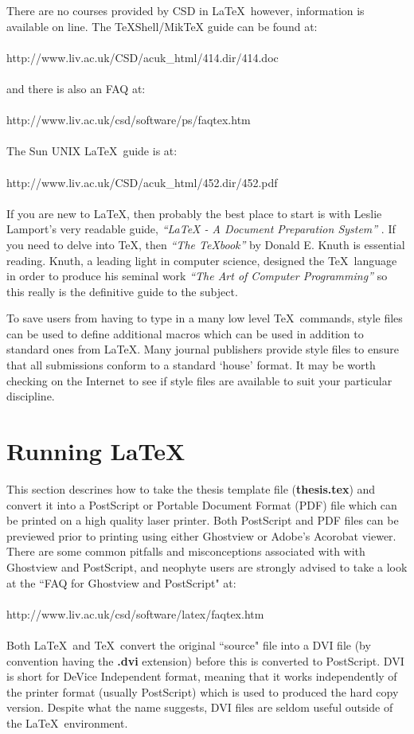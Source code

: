 \documentclass[11pt,oneside]{book}
\begin{document}
There are no courses provided by CSD in \LaTeX \ however, information is available
on line. The TeXShell/MikTeX guide can be found at:
\\
\\
http://www.liv.ac.uk/CSD/acuk\_html/414.dir/414.doc
\\
\\
and there is also an FAQ at:
\\
\\
http://www.liv.ac.uk/csd/software/ps/faqtex.htm
\\
\\
The Sun UNIX \LaTeX \ guide is at:
\\
\\
http://www.liv.ac.uk/CSD/acuk\_html/452.dir/452.pdf
\\
\\
If you are new to \LaTeX, then probably the best place to start is with 
Leslie Lamport's very readable guide, {\em ``LaTeX - A Document Preparation
System''} \cite{latex} . If you need to delve into \TeX, then {\em ``The TeXbook''} \cite{texbook} by 
Donald E. Knuth is essential reading. Knuth, a leading light in 
computer science, designed the \TeX \ language in order to produce
his seminal work {\em ``The Art of Computer Programming''} \cite{artbook} so this really
is the definitive guide to the subject.

To save users from having to type in a many low level
\TeX \ commands, style files can be used to define additional
macros which can be used in addition to standard ones from
\LaTeX. Many journal publishers provide style files to ensure
that all submissions conform to a standard `house' format. It may
be worth checking on the Internet to see if style files are available
to suit your particular discipline.
 
\section{Running \LaTeX}
This section descrines how to take the thesis template file
({\bf thesis.tex}) and convert it into a PostScript or Portable
Document Format (PDF) file which can be printed on a high quality
laser printer. Both PostScript and PDF files can be previewed
prior to printing using either Ghostview or Adobe's Acorobat
viewer. There are some common pitfalls and misconceptions associated with
with Ghostview and PostScript, and neophyte users are strongly
advised to take a look at the ``FAQ for Ghostview and PostScript"
at:
\\
\\
http://www.liv.ac.uk/csd/software/latex/faqtex.htm
\\
\\
Both \LaTeX \ and \TeX \ convert the original ``source" file
into a DVI file (by convention having the {\bf .dvi} extension)
before this is converted to PostScript. DVI is short
for DeVice Independent format, meaning that it works
independently of the printer format (usually PostScript)
which is used to produced the hard copy version. Despite
what the name suggests, DVI files are seldom useful outside
of the \LaTeX \ environment.
\end{document}
